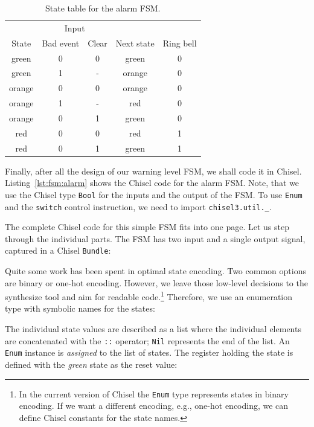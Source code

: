 \documentclass[%
    10pt,
    headinclude, footexclude,
    openright, %
    notitlepage,
    cleardoubleempty,
    headsepline,
    pointlessnumbers,
    bibtotoc, idxtotoc,
    ]{scrbook}
\newcommand{\code}[1]{{\small{\texttt{#1}}}}
\begin{document}
\begin{table}
\centering
\caption{State table for the alarm FSM.}
\begin{tabular}{ccccc}
\toprule
& \multicolumn{2}{c}{Input} \\
\cmidrule{2-3}
State &  Bad event & Clear & Next state & Ring bell \\
\midrule
green & 0 & 0 & green & 0 \\
green & 1 & - & orange & 0 \\
orange & 0 & 0 & orange & 0 \\
orange & 1 & - & red & 0 \\
orange & 0 & 1 & green & 0 \\
red & 0 & 0 & red & 1 \\
red & 0 & 1 & green & 1 \\
\bottomrule
\end{tabular}
\label{tab:state:table}
\end{table}

Finally, after all the design of our warning level FSM, we shall code it in Chisel.
Listing~\ref{lst:fsm:alarm} shows the Chisel code for the alarm FSM.
Note, that we use the Chisel type \code{Bool} for the inputs and the
output of the FSM.
To use \code{Enum} and the \code{switch} control instruction, we need to
import \code{chisel3.util.\_}.


The complete Chisel code for this simple FSM fits into one page.
Let us step through the individual parts.
The FSM has two input and a single output signal, captured in a Chisel \code{Bundle}:
%


\noindent Quite some work has been spent in optimal state encoding. Two common options
are binary or one-hot encoding. However, we leave those low-level decisions to
the synthesize tool and aim for readable code.\footnote{In the current version
of Chisel the \code{Enum} type represents states in binary encoding.
If we want a different encoding, e.g., one-hot encoding, we can define Chisel
constants for the state names.}
Therefore, we use an enumeration type with symbolic names for the states:


\noindent The individual state values are described as a list where the individual
elements are concatenated with the \code{::} operator; \code{Nil} represents
the end of the list. An \code{Enum} instance is \emph{assigned} to the list of states.
The register holding the state is defined with the \emph{green} state as the reset value:
\end{document}
